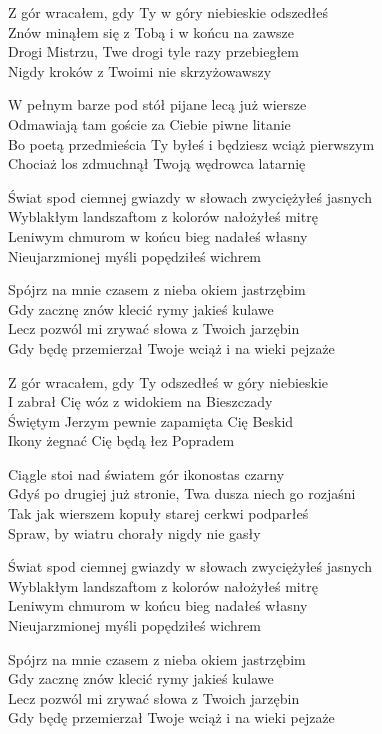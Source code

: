 \begin{text}
\footnotesize{Z gór wracałem, gdy Ty w góry niebieskie odszedłeś\\
Znów minąłem się z Tobą i w końcu na zawsze\\
Drogi Mistrzu, Twe drogi tyle razy przebiegłem\\
Nigdy kroków z Twoimi nie skrzyżowawszy

W pełnym barze pod stół pijane lecą już wiersze\\
Odmawiają tam goście za Ciebie piwne litanie\\
Bo poetą przedmieścia Ty byłeś i będziesz wciąż pierwszym\\
Chociaż los zdmuchnął Twoją wędrowca latarnię

Świat spod ciemnej gwiazdy w słowach zwyciężyłeś jasnych\\
Wyblakłym landszaftom z kolorów nałożyłeś mitrę\\
Leniwym chmurom w końcu bieg nadałeś własny\\
Nieujarzmionej myśli popędziłeś wichrem

Spójrz na mnie czasem z nieba okiem jastrzębim\\
Gdy zacznę znów klecić rymy jakieś kulawe\\
Lecz pozwól mi zrywać słowa z Twoich jarzębin\\
Gdy będę przemierzał Twoje wciąż i na wieki pejzaże

Z gór wracałem, gdy Ty odszedłeś w góry niebieskie\\
I zabrał Cię wóz z widokiem na Bieszczady\\
Świętym Jerzym pewnie zapamięta Cię Beskid\\
Ikony żegnać Cię będą łez Popradem

Ciągle stoi nad światem gór ikonostas czarny\\
Gdyś po drugiej już stronie, Twa dusza niech go rozjaśni\\
Tak jak wierszem kopuły starej cerkwi podparłeś\\
Spraw, by wiatru chorały nigdy nie gasły

Świat spod ciemnej gwiazdy w słowach zwyciężyłeś jasnych\\
Wyblakłym landszaftom z kolorów nałożyłeś mitrę\\
Leniwym chmurom w końcu bieg nadałeś własny\\
Nieujarzmionej myśli popędziłeś wichrem

Spójrz na mnie czasem z nieba okiem jastrzębim\\
Gdy zacznę znów klecić rymy jakieś kulawe\\
Lecz pozwól mi zrywać słowa z Twoich jarzębin\\
Gdy będę przemierzał Twoje wciąż i na wieki pejzaże}
\end{text}
